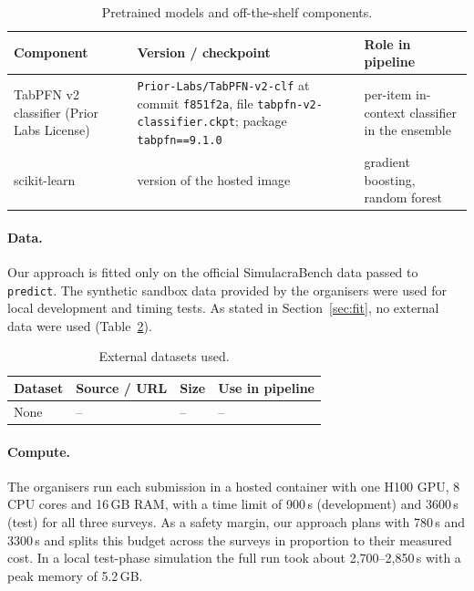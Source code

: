 \documentclass{article}
\begin{document}
\begin{table}[h]
  \centering
  \small
  \caption{Pretrained models and off-the-shelf components.}
  \label{tab:models}
  \begin{tabular}{>{\raggedright\arraybackslash}p{3.0cm}>{\raggedright\arraybackslash}p{5.4cm}>{\raggedright\arraybackslash}p{4.0cm}}
    \toprule
    Component & Version / checkpoint & Role in pipeline  \\
    \midrule
    TabPFN v2 classifier (Prior Labs License) & \texttt{Prior-Labs/TabPFN-v2-clf} at commit \texttt{f851f2a}, file \texttt{tabpfn-v2-classifier.ckpt}; package \texttt{tabpfn==9.1.0} & per-item in-context classifier in the ensemble \\
    scikit-learn & version of the hosted image & gradient boosting, random forest \\
    \bottomrule
  \end{tabular}
\end{table}

\paragraph{Data.} Our approach is fitted only on the official SimulacraBench data passed to
\texttt{predict}. The synthetic sandbox data provided by the organisers were used for local
development and timing tests. As stated in Section~\ref{sec:fit}, no external data were used
(Table~\ref{tab:external}).

\begin{table}[h]
  \centering
  \small
  \caption{External datasets used.}
  \label{tab:external}
  \begin{tabular}{llll}
    \toprule
    Dataset & Source / URL & Size & Use in pipeline \\
    \midrule
    None & -- & -- & -- \\
    \bottomrule
  \end{tabular}
\end{table}

\paragraph{Compute.} The organisers run each submission in a hosted container with one H100 GPU,
8 CPU cores and 16\,GB RAM, with a time limit of 900\,s (development) and 3600\,s (test) for all three
surveys. As a safety margin, our approach plans with 780\,s and 3300\,s and splits this budget across
the surveys in proportion to their measured cost. In a local test-phase simulation the full run took about 2{,}700--2{,}850\,s with a peak memory
of 5.2\,GB.
\end{document}
